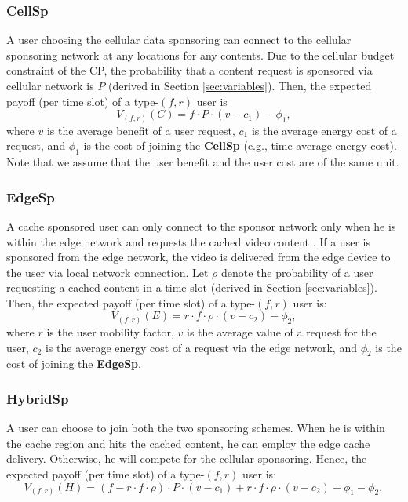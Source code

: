 \subsubsection{\textbf{CellSp}}
 A user choosing the cellular data sponsoring can connect to the cellular sponsoring network at any locations for any contents. Due to the cellular budget constraint of the CP, the probability that a content request is sponsored via cellular network is $P$ (derived in Section \ref{sec:variables}). Then, the expected payoff (per time slot) of a type-$(f, r)$ user is
\begin{equation}V_{(f, r)}(C)=f\cdot P\cdot (v-c_1)-\phi_1,\end{equation}
where $v$ is the average benefit of a user request, $c_1$ is the average energy cost of a request, and $\phi_1$ is the cost of joining the \textbf{CellSp} (e.g., time-average energy cost). Note that we assume that the user benefit and the user cost are of the same unit.
	
 \subsubsection{\textbf{EdgeSp}}
A cache sponsored user can only connect to the sponsor network only when he is within the edge network and requests the cached video content \cite{mobilitypred}. If a user is sponsored from the edge network, the video is delivered from the edge device to the user via local network connection. Let $\rho$ denote the probability of a user requesting a cached content in a time slot (derived in Section \ref{sec:variables}). Then, the expected payoff (per time slot) of a type-$(f, r)$ user is:
 \begin{equation}V_{(f, r)}(E)=r\cdot f\cdot\rho \cdot (v-c_2)-\phi_2,\end{equation}
where $r$ is the user mobility factor, $v$ is the average value of a request for the user, $c_2$ is the average energy cost of a request via the edge network, and $\phi_2$ is the cost of joining the \textbf{EdgeSp}.

 \subsubsection{\textbf{HybridSp}}
A user can choose to join both the two sponsoring schemes. When he is within the cache region and hits the cached content, he can employ the edge cache delivery. Otherwise, he will compete for the cellular sponsoring. Hence, the expected payoff (per time slot) of a type-$(f, r)$ user is:
\begin{equation}V_{(f, r)}(H)=(f-r\cdot f\cdot\rho)\cdot P\cdot (v-c_1)+r\cdot f\cdot\rho \cdot (v-c_2)-\phi_1-\phi_2,\end{equation}

